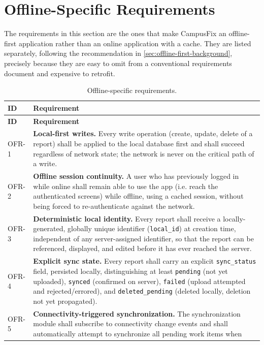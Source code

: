 \section{Offline-Specific Requirements}
\label{sec:offline-req}

The requirements in this section are the ones that make CampusFix an
offline-first application rather than an online application with a cache.
They are listed separately, following the recommendation in
\cref{sec:offline-first-background}, precisely because they are easy to
omit from a conventional requirements document and expensive to retrofit.

\begin{longtable}{@{}p{1.6cm}p{9.0cm}@{}}
\caption{Offline-specific requirements.}
\label{tab:offline-req}\\
\toprule
\textbf{ID} & \textbf{Requirement} \\
\midrule
\endfirsthead
\toprule
\textbf{ID} & \textbf{Requirement} \\
\midrule
\endhead
OFR-1 & \textbf{Local-first writes.} Every write operation (create,
update, delete of a report) shall be applied to the local database first
and shall succeed regardless of network state; the network is never on
the critical path of a write. \\
OFR-2 & \textbf{Offline session continuity.} A user who has previously
logged in while online shall remain able to use the app (i.e. reach the
authenticated screens) while offline, using a cached session, without
being forced to re-authenticate against the network. \\
OFR-3 & \textbf{Deterministic local identity.} Every report shall receive
a locally-generated, globally unique identifier (\texttt{local\_id}) at
creation time, independent of any server-assigned identifier, so that the
report can be referenced, displayed, and edited before it has ever
reached the server. \\
OFR-4 & \textbf{Explicit sync state.} Every report shall carry an explicit
\texttt{sync\_status} field, persisted locally, distinguishing at least
\texttt{pending} (not yet uploaded), \texttt{synced} (confirmed on
server), \texttt{failed} (upload attempted and rejected/errored), and
\texttt{deleted\_pending} (deleted locally, deletion not yet propagated).
\\
OFR-5 & \textbf{Connectivity-triggered synchronization.} The
synchronization module shall subscribe to connectivity change events and
shall automatically attempt to synchronize all pending work items when

\end{longtable}
